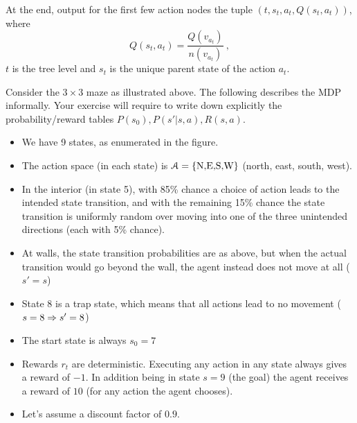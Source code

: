 At the end, output for the first few action nodes the
tuple $(t, s_t, a_t, Q(s_t,a_t))$, where
$$Q(s_t,a_t) = \frac{Q(v_{a_t})}{n(v_{a_t})} ~,$$
$t$ is the tree level and $s_t$ is the unique parent state of the action $a_t$.





Consider the $3\times 3$ maze as illustrated above. The following describes the MDP informally. Your exercise will require to write down explicitly the probability/reward tables $P(s_0), P(s'|s,a), R(s,a)$.
\begin{itemize}
\item We have 9 states, as enumerated in the figure.
\item The action space (in each state) is $\AA=\{\text{N,E,S,W}\}$ (north, east, south, west).
\item In the interior (in state 5), with 85\% chance a choice of action leads to the intended state transition, and with the remaining 15\% chance the state transition is uniformly random over moving into one of the three unintended directions (each with 5\% chance).
\item At walls, the state transition probabilities are as above, but when the actual transition would go beyond the wall, the agent instead does not move at all ($s'=s$)
\item State 8 is a trap state, which means that all actions lead to no movement ($s=8 \To s'=8$)
\item The start state is always $s_0=7$
\item Rewards $r_t$ are deterministic. Executing any action in any state always gives a reward of $-1$. In addition being in state $s=9$ (the goal) the agent receives a reward of $10$ (for any action the agent chooses).
\item Let's assume a discount factor of $0.9$.
\end{itemize}

